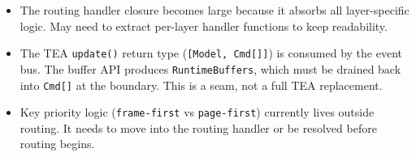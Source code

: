 \begin{itemize}
\tightlist
\item
  The routing handler closure becomes large because it absorbs all layer-specific logic. May need to extract per-layer handler functions to keep readability.
\item
  The TEA \texttt{u\allowbreak{}p\allowbreak{}d\allowbreak{}a\allowbreak{}t\allowbreak{}e\allowbreak{}(\allowbreak{})} return type (\texttt{[\allowbreak{}M\allowbreak{}o\allowbreak{}d\allowbreak{}e\allowbreak{}l\allowbreak{},\allowbreak{} \allowbreak{}C\allowbreak{}m\allowbreak{}d\allowbreak{}[\allowbreak{}]\allowbreak{}]}) is consumed by the event bus. The buffer API produces \texttt{R\allowbreak{}u\allowbreak{}n\allowbreak{}t\allowbreak{}i\allowbreak{}m\allowbreak{}e\allowbreak{}B\allowbreak{}u\allowbreak{}f\allowbreak{}f\allowbreak{}e\allowbreak{}r\allowbreak{}s}, which must be drained back into \texttt{C\allowbreak{}m\allowbreak{}d\allowbreak{}[\allowbreak{}]} at the boundary. This is a seam, not a full TEA replacement.
\item
  Key priority logic (\texttt{f\allowbreak{}r\allowbreak{}a\allowbreak{}m\allowbreak{}e\allowbreak{}-\allowbreak{}f\allowbreak{}i\allowbreak{}r\allowbreak{}s\allowbreak{}t} vs \texttt{p\allowbreak{}a\allowbreak{}g\allowbreak{}e\allowbreak{}-\allowbreak{}f\allowbreak{}i\allowbreak{}r\allowbreak{}s\allowbreak{}t}) currently lives outside routing. It needs to move into the routing handler or be resolved before routing begins.
\end{itemize}

